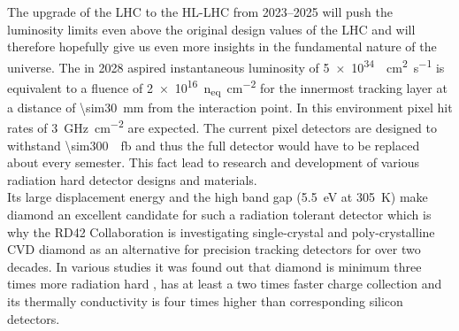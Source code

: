 The upgrade of the \ac{LHC} to the \ac{HL-LHC} from \SIrange{2023}{2025}{} \cite{hllhc} will push the luminosity limits even above the original design values of the \ac{LHC} and will therefore hopefully give us even more insights in the fundamental nature of the universe. The in 2028 aspired instantaneous luminosity of \SI{5e34}{\per\centi\meter\squared\per\second}  is equivalent to a fluence of \SI{2e16}{n_{eq}\per \centi\meter^2} \cite{auzinger} for the innermost tracking layer at a distance of \SI{\sim30}{\milli\meter} from the interaction point. In this environment pixel hit rates of \SI{3}{\giga\hertz\per\centi\meter^2} are expected. The current pixel detectors are designed to withstand \SI{\sim300}{\per\femto\barn} and thus the full detector would have to be replaced about every semester. This fact lead to research and development of various radiation hard detector designs and materials.\\
Its large displacement energy and the high band gap (\SI{5.5}{\electronvolt} at \SI{305}{\kelvin}) make diamond an excellent candidate for such a radiation tolerant detector which is why the RD42 Collaboration is investigating single-crystal and poly-crystalline \ac{CVD} diamond as an alternative for precision tracking detectors for over two decades. In various studies it was found out that diamond is minimum three times more radiation hard \cite{deboer}, has at least a two times faster charge collection \cite{bla} and its thermally conductivity is four times higher \cite{blub} than corresponding silicon detectors.